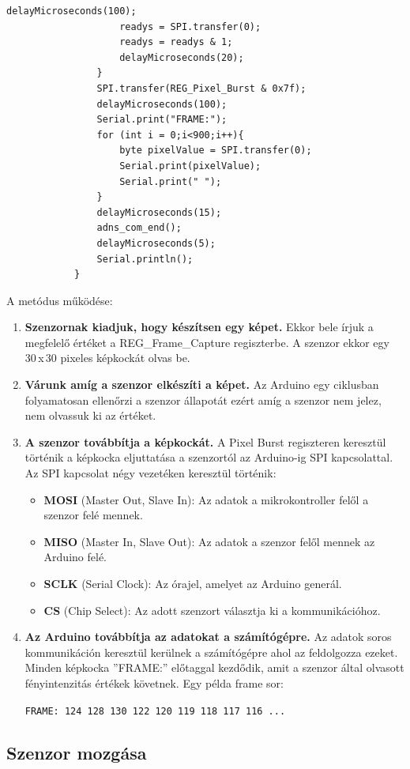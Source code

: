 \documentclass[]{thesis-ekf}
\theoremstyle{definition}
\theoremstyle{remark}
\begin{document}
\begin{enumerate}
\begin{lstlisting}[language=Arduino,label=sendFrame]
					delayMicroseconds(100); 
					readys = SPI.transfer(0); 
					readys = readys & 1;
					delayMicroseconds(20);
				}
				SPI.transfer(REG_Pixel_Burst & 0x7f); 
				delayMicroseconds(100); 
				Serial.print("FRAME:");
				for (int i = 0;i<900;i++){
					byte pixelValue = SPI.transfer(0);  
					Serial.print(pixelValue);
					Serial.print(" ");
				}
				delayMicroseconds(15); 
				adns_com_end();  
				delayMicroseconds(5); 
				Serial.println();
			}
		\end{lstlisting}
		A metódus működése:
		\begin{enumerate}[label=\arabic*.]
			\item \textbf{Szenzornak kiadjuk, hogy készítsen egy képet.} Ekkor bele írjuk a megfelelő értéket a REG\_Frame\_Capture regiszterbe. A szenzor ekkor egy 30\,x\,30 pixeles képkockát olvas be.
			\item \textbf{Várunk amíg a szenzor elkészíti a képet.} Az Arduino egy ciklusban folyamatosan ellenőrzi a szenzor állapotát ezért amíg a szenzor nem jelez, nem olvassuk ki az értéket.
			\item \textbf{A szenzor továbbítja a képkockát.} A Pixel Burst regiszteren keresztül történik a képkocka eljuttatása a szenzortól az Arduino-ig SPI kapcsolattal. Az SPI kapcsolat négy vezetéken keresztül történik:
			\begin{itemize}
				\item \textbf{MOSI }(Master Out, Slave In): Az adatok a mikrokontroller felől a szenzor felé mennek.
				\item \textbf{MISO }(Master In, Slave Out): Az adatok a szenzor felől mennek az Arduino felé.
				\item \textbf{SCLK }(Serial Clock): Az órajel, amelyet az Arduino generál.
				\item \textbf{CS }(Chip Select): Az adott szenzort választja ki a kommunikációhoz.
			\end{itemize}
			\item \textbf{Az Arduino továbbítja az adatokat a számítógépre.} Az adatok soros kommunikáción keresztül kerülnek a számítógépre ahol az feldolgozza ezeket. Minden képkocka ''FRAME:'' előtaggal kezdődik, amit a szenzor által olvasott fényintenzitás értékek követnek. Egy példa frame sor:
			
			\verb|FRAME: 124 128 130 122 120 119 118 117 116 ...|
		\end{enumerate}
	\end{enumerate}
	\subsection{Szenzor mozgása}
	
\end{document}
